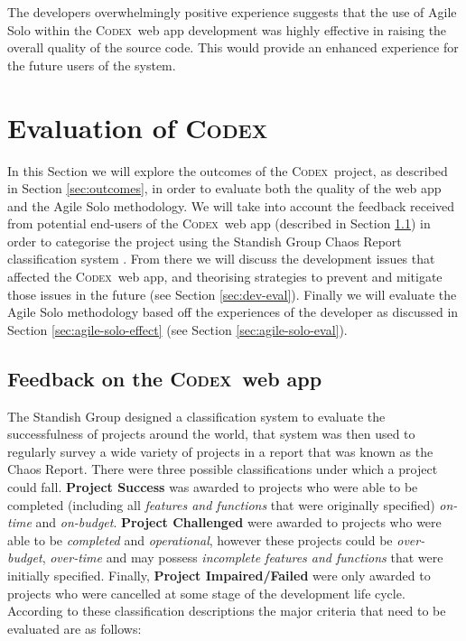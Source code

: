 \documentclass[final]{cmpreport}
\newcommand{\Codex}{\textsc{Codex}}
\begin{document}
		The developers overwhelmingly positive experience suggests that the use of Agile Solo within the \Codex \ web app development was highly effective in raising the overall quality of the source code. This would provide an enhanced experience for the future users of the system. 		

	\section{Evaluation of \Codex} \label{sec:evaluation}
	In this Section we will explore the outcomes of the \Codex \ project, as described in Section \ref{sec:outcomes}, in order to evaluate both the quality of the web app and the Agile Solo methodology. We will take into account the feedback received from potential end-users of the \Codex \ web app (described in Section \ref{sec:feedback}) in order to categorise the project using the Standish Group Chaos Report classification system \citep{chaos-report}. From there we will discuss the development issues that affected the \Codex \ web app, and theorising strategies to prevent and mitigate those issues in the future (see Section \ref{sec:dev-eval}). Finally we will evaluate the Agile Solo methodology based off the experiences of the developer as discussed in Section \ref{sec:agile-solo-effect} (see Section \ref{sec:agile-solo-eval}). 
	
		\subsection{Feedback on the \Codex \ web app} \label{sec:feedback}
		The Standish Group designed a classification system to evaluate the successfulness of projects around the world, that system was then used to regularly survey a wide variety of projects in a report that was known as the Chaos Report. There were three possible classifications under which a project could fall. \textbf{Project Success} was awarded to projects who were able to be completed (including all \textit{features and functions} that were originally specified) \textit{on-time} and \textit{on-budget}. \textbf{Project Challenged} were awarded to projects who were able to be \textit{completed} and \textit{operational}, however these projects could be \textit{over-budget}, \textit{over-time} and may possess \textit{incomplete features and functions} that were initially specified. Finally, \textbf{Project Impaired/Failed} were only awarded to projects who were cancelled at some stage of the development life cycle. According to these classification descriptions the major criteria that need to be evaluated are as follows:
		
\end{document}
